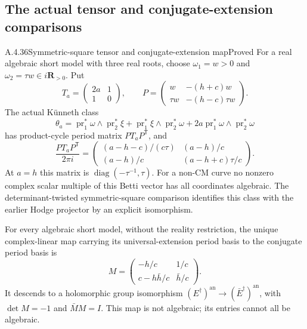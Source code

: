 \subsection{The actual tensor and conjugate-extension comparisons}

\begin{result}{A.4.36}{Symmetric-square tensor and conjugate-extension map}{Proved}
For a real algebraic short model with three real roots, choose
$\omega_1=w>0$ and $\omega_2=\tau w\in i\mathbf R_{>0}$.
Put
\[
 T_a=\begin{pmatrix}2a&1\\1&0\end{pmatrix},\qquad
 P=\begin{pmatrix}w&-(h+c)w\\ \tau w&-(h-c)\tau w\end{pmatrix}.
\]
The actual K\"unneth class
\[
 \theta_a=\operatorname{pr}_1^*\omega\wedge\operatorname{pr}_2^*\xi
 +\operatorname{pr}_1^*\xi\wedge\operatorname{pr}_2^*\omega
 +2a\operatorname{pr}_1^*\omega\wedge\operatorname{pr}_2^*\omega
\]
has product-cycle period matrix $PT_aP^{\mathsf T}$, and
\[
 \frac{PT_aP^{\mathsf T}}{2\pi i}
 =\begin{pmatrix}
 (a-h-c)/(c\tau)&(a-h)/c\\
 (a-h)/c&(a-h+c)\tau/c
 \end{pmatrix}.
\]
At $a=h$ this matrix is $\operatorname{diag}(-\tau^{-1},\tau)$.
For a non-CM curve no nonzero complex scalar multiple of this Betti
vector has all coordinates algebraic. The determinant-twisted
symmetric-square comparison identifies this class with the earlier
Hodge projector by an explicit isomorphism.

For every algebraic short model, without the reality restriction,
the unique complex-linear map carrying its universal-extension
period basis to the conjugate period basis is
\[
 M=\begin{pmatrix}
 -h/c&1/c\\ c-h\bar h/c&\bar h/c
 \end{pmatrix}.
\]
It descends to a holomorphic group isomorphism
$(E^\dagger)^{\mathrm{an}}\to(\bar E^\dagger)^{\mathrm{an}}$, with
$\det M=-1$ and $\bar M M=I$. This map is not algebraic; its entries
cannot all be algebraic.
\end{result}

